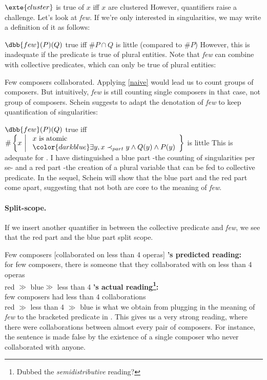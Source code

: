 \documentclass[english]{article}
\begin{document}
\ex
$\exte{cluster}$ is true of $x$ iff $x$ are clustered
\xe
%
However, quantifiers raise a challenge. Let's look at \emph{few}. If we're only interested in singularities, we may write a definition of it as follows:

\ex \label{naive}
 $\dbb{few}(P)(Q)$ true iff $\#P\cap Q$ is little (compared to $\#P$)
\xe
%
However, this is inadequate if the predicate is true of plural entities. Note that \emph{few} can combine with collective predicates, which can only be true of plural entities:

\ex\label{collab}
Few composers collaborated.
\xe
%
Applying \cref{naive} would lead us to count groups of composers. But intuitively, \emph{few} is still counting single composers in that case, not group of composers. Schein suggests to adapt the denotation of \emph{few} to keep quantification of singularities:

\ex
{\color{darkred}$\dbb{few}(P)(Q)$ true iff $\#\left\lbrace x\ \middle|\ 
\begin{array}{l}
x\text{ is atomic}\\
{\color{darkblue}\exists y, x\prec_{part} y \wedge Q(y) \wedge P(y)}
\end{array}
\right\rbrace$ is little \label{few2}
}\xe
%
This is adequate for . I have distinguished a blue part -the counting of singularities per se- and a red part -the creation of a plural variable that can be fed to collective predicate.
In the sequel, Schein will show that the blue part and the red part come apart, suggesting that not both are core to the meaning of \emph{few}.

\paragraph{Split-scope.} If we insert another quantifier in between the collective predicate and \emph{few}, we see that the red part and the blue part split scope.

\pex
\a Few composers [collaborated on less than 4 operas]
\a 
\textbf{'s predicted reading:}\\
 for few composers, there is someone that they collaborated with on less than 4 operas\\
{\color{darkred}red} $\gg$ {\color{darkblue}blue}$\gg$ less than 4
\a \textbf{\cnextx{a}'s actual reading\footnote{Dubbed the \emph{semidistributive} reading?}:}\\
 few composers had less than 4 collaborations\\ 
{\color{darkred}red} $\gg$ less than 4 $\gg$ {\color{darkblue}blue}
\xe
%
 is what we obtain from plugging in the meaning of  \emph{few} to the bracketed predicate in . This gives us a very strong reading, where there were collaborations between almost every pair of composers. For instance, the sentence is made false by the existence of a single composer who never collaborated with anyone. 
\end{document}
